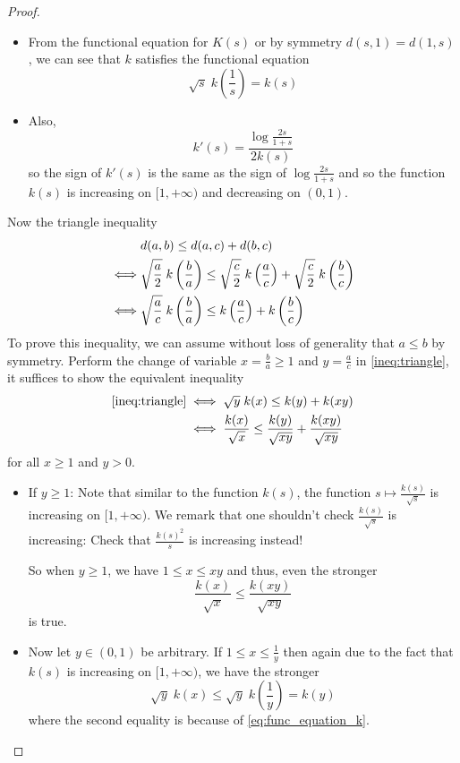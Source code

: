 \documentclass[10pt]{amsart}
\begin{document}
\begin{proof}
\begin{itemize}
\item From the functional equation for $K(s)$ or by symmetry $d(s, 1) = d(1, s)$, we can see that $k$ satisfies the functional equation
\begin{equation}
\sqrt{s} \; k\left(\frac{1}{s}\right) = k(s)
\label{eq:func_equation_k}
\end{equation}

\item Also,
$$k'(s) = \frac{\log\frac{2s}{1 + s}}{2 k(s)}$$
so the sign of $k'(s)$ is the same as the sign of $\log\frac{2s}{1 + s}$ and so the function $k(s)$ is increasing on $[1, +\infty)$ and decreasing on $(0, 1)$.
\end{itemize}

Now the triangle inequality
\begin{align}
&d(a, b) \leq d(a, c) + d(b, c) \notag\\
\iff &\sqrt{\frac{a}{2}} \; k\left(\frac{b}{a}\right) \leq \sqrt{\frac{c}{2}} \; k\left(\frac{a}{c}\right) + \sqrt{\frac{c}{2}} \; k\left(\frac{b}{c}\right) \notag\\
\iff &\sqrt{\frac{a}{c}} \; k\left(\frac{b}{a}\right) \leq k\left(\frac{a}{c}\right) + k\left(\frac{b}{c}\right) \label{ineq:triangle}
\end{align}
To prove this inequality, we can assume without loss of generality that $a \leq b$ by symmetry. Perform the change of variable $x = \frac{b}{a} \geq 1$ and $y = \frac{a}{c}$ in \eqref{ineq:triangle}, it suffices to show the equivalent inequality
\begin{align*}
\eqref{ineq:triangle} &\iff \sqrt{y} \; k(x) \leq k(y) + k(xy)\\
&\iff \frac{k(x)}{\sqrt{x}} \leq \frac{k(y)}{\sqrt{xy}} + \frac{k(xy)}{\sqrt{xy}}
\end{align*}
for all $x \geq 1$ and $y > 0$.

\begin{itemize}

\item If $y \geq 1$: Note that similar to the function $k(s)$, the function $s \mapsto \frac{k(s)}{\sqrt{s}}$ is increasing on $[1, +\infty)$. We remark that one shouldn't check $\frac{k(s)}{\sqrt{s}}$ is increasing: Check that $\frac{k(s)^2}{s}$ is increasing instead!

So when $y \geq 1$, we have $1 \leq x \leq xy$ and thus, even the stronger $$\frac{k(x)}{\sqrt{x}} \leq \frac{k(xy)}{\sqrt{xy}}$$ is true.

\item Now let $y \in (0, 1)$ be arbitrary. If $1 \leq x \leq \frac{1}{y}$ then again due to the fact that $k(s)$ is increasing on $[1, +\infty)$, we have the stronger
$$\sqrt{y} \; k(x) \leq \sqrt{y} \; k\left(\frac{1}{y}\right) = k(y)$$
where the second equality is because of \eqref{eq:func_equation_k}.


\end{itemize}
\end{proof}
\end{document}
